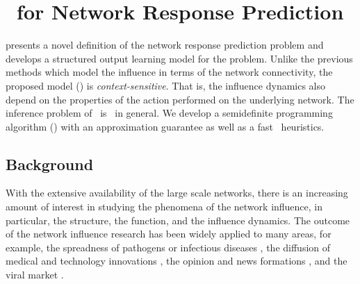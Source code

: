 {%
%
\section{\spin\ for Network Response Prediction} \label{sc_su14a}

 presents a novel definition of the network response prediction problem and develops a structured output learning model for the problem.
Unlike the previous methods which model the influence in terms of the network connectivity, the proposed model (\spin) is \textit{context-sensitive}. 
That is, the influence dynamics also depend on the properties of the action performed on the underlying network.
The inference problem of \spin\ is \nphard\ in general.
We develop a semidefinite programming algorithm (\sdp) with an approximation guarantee as well as a fast \greedy\ heuristics.

\subsection{Background}

With the extensive availability of the large scale networks, there is an increasing amount of interest in studying the phenomena of the network influence, in particular, the structure, the function, and the influence dynamics. 
The outcome of the network influence research has been widely applied to many areas, for example, the spreadness of pathogens or infectious diseases \citep{Hethcote00the,Anderson02infectious}, the diffusion of medical and technology innovations \citep{Strang98diffusion,Rogers03the}, the opinion and news formations \citep{Adar04implicit,Gruhl04information,Adar05tracking,Leskovec07cascading,Nowell08tracing,Leskovec09meme}, and the viral market \citep{Domingos01mining,Kempe03maximizing,Liben-Nowell03the}.

}
